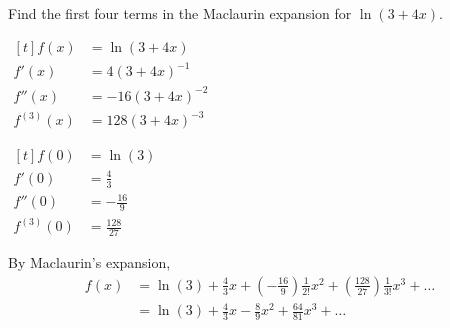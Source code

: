 \documentclass[11pt,a4paper]{book}
\begin{document}
\begin{example}

Find the first four terms in the Maclaurin expansion for $\ln\left(3+4x\right)$.

\Solution

\begin{minipage}[t]{0.4\textwidth}

$
\begin{aligned}[t]
f\left(x\right) & =\ln\left(3+4x\right)\\
f'\left(x\right) & =4\left(3+4x\right)^{-1}\\
f''\left(x\right) & =-16\left(3+4x\right)^{-2}\\
f^{\left(3\right)}\left(x\right) & =128\left(3+4x\right)^{-3}
\end{aligned}
$

\end{minipage}
\vline\hfill
\begin{minipage}[t]{0.5\textwidth}

$
\begin{aligned}[t]
f\left(0\right) & =\ln\left(3\right)\\
f'\left(0\right) & =\frac{4}{3}\\
f''\left(0\right) & =-\frac{16}{9}\\
f^{\left(3\right)}\left(0\right) & =\frac{128}{27}
\end{aligned}
$

\end{minipage}

By Maclaurin's expansion,
\begin{align*}
f\left(x\right) & =\ln\left(3\right)+\frac{4}{3}x+\left(-\frac{16}{9}\right)\frac{1}{2!}x^{2}+\left(\frac{128}{27}\right)\frac{1}{3!}x^{3}+\ldots\\
 & =\ln\left(3\right)+\frac{4}{3}x-\frac{8}{9}x^{2}+\frac{64}{81}x^{3}+\ldots
\end{align*}

\end{example}

\newpage
\end{document}
